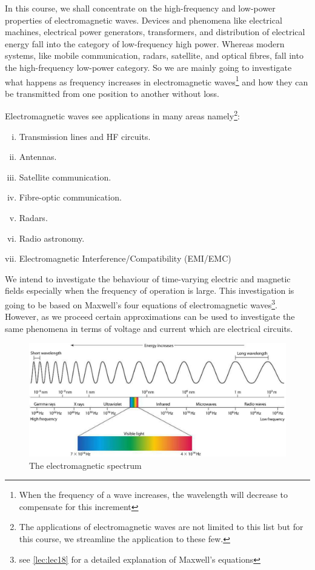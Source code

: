 In this course, we shall concentrate on the high-frequency and low-power properties of electromagnetic waves. Devices and phenomena like electrical machines, electrical power generators, transformers, and distribution of electrical energy fall into the category of low-frequency high power. Whereas modern systems, like mobile communication, radars, satellite, and optical fibres, fall into the high-frequency low-power category. So we are mainly going to investigate what happens as frequency increases in electromagnetic waves\footnote{When the frequency of a wave increases, the wavelength will decrease to compensate for this increment} and how they can be transmitted from one position to another without loss.

Electromagnetic waves see applications in many areas namely\footnote{The applications of electromagnetic waves are not limited to this list but for this course, we streamline the application to these few.}:
\begin{enumerate}[(i)]
\item Transmission lines and HF circuits.
\item Antennas.
\item Satellite communication.
\item Fibre-optic communication.
\item Radars.
\item Radio astronomy.
\item Electromagnetic Interference/Compatibility (EMI/EMC)
\end{enumerate}


We intend to investigate the behaviour of time-varying electric and magnetic fields especially when the frequency of operation is large. This investigation is going to be based on Maxwell's four equations of electromagnetic waves\footnote{see \autoref{lec:lec18} for a detailed explanation of Maxwell's equations}. However, as we proceed certain approximations can be used to investigate the same phenomena in terms of voltage and current which are electrical circuits.

\begin{figure}[h]
\centering
\includegraphics[width=1\linewidth]{./graphics/electromagneticspectrum}
\caption{The electromagnetic spectrum}
\label{fig:electromagneticspectrum}
\end{figure}

